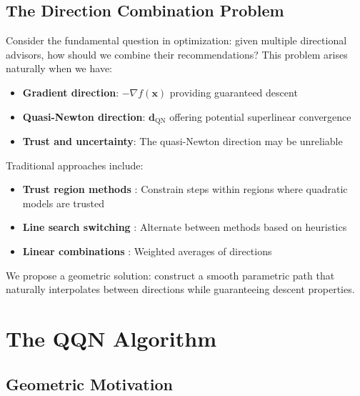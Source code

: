 \hypertarget{the-direction-combination-problem}{%
\subsection{The Direction Combination Problem}\label{the-direction-combination-problem}}

Consider the fundamental question in optimization: given multiple directional advisors, how should we combine their recommendations? This problem arises naturally when we have:

\begin{itemize}
\tightlist
\item
  \textbf{Gradient direction}: \(-\nabla f(\mathbf{x})\) providing guaranteed descent
\item
  \textbf{Quasi-Newton direction}: \(\mathbf{d}_{\text{QN}}\) offering potential superlinear convergence
\item
  \textbf{Trust and uncertainty}: The quasi-Newton direction may be unreliable
\end{itemize}

Traditional approaches include:

\begin{itemize}
\tightlist
\item
  \textbf{Trust region methods} \citep{conn2000trust}: Constrain steps within regions where quadratic models are trusted
\item
  \textbf{Line search switching} \citep{morales2000automatic}: Alternate between methods based on heuristics
\item
  \textbf{Linear combinations} \citep{biggs1973minimization}: Weighted averages of directions
\end{itemize}

We propose a geometric solution: construct a smooth parametric path that naturally interpolates between directions while guaranteeing descent properties.

\hypertarget{the-qqn-algorithm}{%
\section{The QQN Algorithm}\label{the-qqn-algorithm}}

\hypertarget{geometric-motivation}{%
\subsection{Geometric Motivation}\label{geometric-motivation}}

